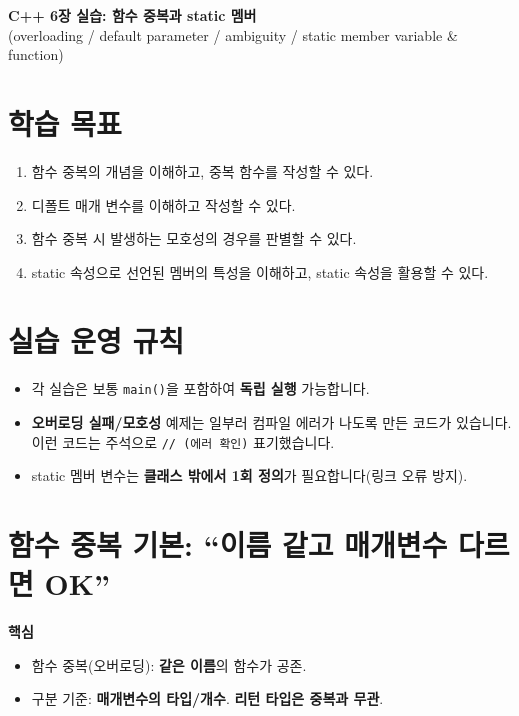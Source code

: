 \documentclass[11pt,a4paper]{article}
\begin{document}
\begin{center}
  {\LARGE \textbf{C++ 6장 실습: 함수 중복과 static 멤버}}\\
  \vspace{6pt}
  {\large (overloading / default parameter / ambiguity / static member variable \& function)}
\end{center}

\vspace{8pt}

\section*{학습 목표}
\begin{GoalBox}
\begin{enumerate}[leftmargin=18pt]
  \item 함수 중복의 개념을 이해하고, 중복 함수를 작성할 수 있다.
  \item 디폴트 매개 변수를 이해하고 작성할 수 있다.
  \item 함수 중복 시 발생하는 모호성의 경우를 판별할 수 있다.
  \item static 속성으로 선언된 멤버의 특성을 이해하고, static 속성을 활용할 수 있다.
\end{enumerate}
\end{GoalBox}

\section*{실습 운영 규칙}
\begin{itemize}[leftmargin=18pt]
  \item 각 실습은 보통 \texttt{main()}을 포함하여 \textbf{독립 실행} 가능합니다.
  \item \textbf{오버로딩 실패/모호성} 예제는 일부러 컴파일 에러가 나도록 만든 코드가 있습니다.
        이런 코드는 주석으로 \texttt{// (에러 확인)} 표기했습니다.
  \item static 멤버 변수는 \textbf{클래스 밖에서 1회 정의}가 필요합니다(링크 오류 방지).
\end{itemize}

\tableofcontents
\newpage

\section{함수 중복 기본: ``이름 같고 매개변수 다르면 OK''}
\begin{GoalBox}
\textbf{핵심}
\begin{itemize}[leftmargin=18pt]
  \item 함수 중복(오버로딩): \textbf{같은 이름}의 함수가 공존.
  \item 구분 기준: \textbf{매개변수의 타입/개수}. \textbf{리턴 타입은 중복과 무관}.
\end{itemize}
\end{GoalBox}
\end{document}
